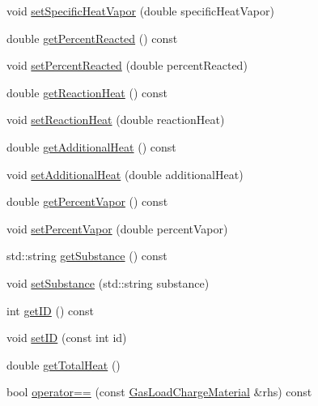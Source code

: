 \begin{DoxyCompactItemize}
\item 
void \hyperlink{class_gas_load_charge_material_a7498eba84bb8bdfc5344f0e44418260b}{set\+Specific\+Heat\+Vapor} (double specific\+Heat\+Vapor)
\item 
double \hyperlink{class_gas_load_charge_material_af47b4c6c3e547325cadd81cbb09937ee}{get\+Percent\+Reacted} () const
\item 
void \hyperlink{class_gas_load_charge_material_a7142cb6bbfba53d640dd6f1590fe32f6}{set\+Percent\+Reacted} (double percent\+Reacted)
\item 
double \hyperlink{class_gas_load_charge_material_a605eaf21d1f25f27b53627aeb903c93d}{get\+Reaction\+Heat} () const
\item 
void \hyperlink{class_gas_load_charge_material_a721f02cbd0bfbb6ebe67c0da09f0b0f2}{set\+Reaction\+Heat} (double reaction\+Heat)
\item 
double \hyperlink{class_gas_load_charge_material_a5c01f171b61c01c93db6453cb122e1ba}{get\+Additional\+Heat} () const
\item 
void \hyperlink{class_gas_load_charge_material_a08ef5196ea9919dfc71be6744c7da08e}{set\+Additional\+Heat} (double additional\+Heat)
\item 
double \hyperlink{class_gas_load_charge_material_a19b8ecfad235b5824b0a88903cff667a}{get\+Percent\+Vapor} () const
\item 
void \hyperlink{class_gas_load_charge_material_acace81e16ef531acb0a68462ab0ed25d}{set\+Percent\+Vapor} (double percent\+Vapor)
\item 
std\+::string \hyperlink{class_gas_load_charge_material_a5f967841f196f6b0b35f32f9610092e3}{get\+Substance} () const
\item 
void \hyperlink{class_gas_load_charge_material_a20cc3df601d8daae9b8f8e7b0c53c2e3}{set\+Substance} (std\+::string substance)
\item 
int \hyperlink{class_gas_load_charge_material_ab3e425ad095a593b7e9e365606759d9d}{get\+ID} () const
\item 
void \hyperlink{class_gas_load_charge_material_a12d67d6f764318ab09ca340884e717f9}{set\+ID} (const int id)
\item 
double \hyperlink{class_gas_load_charge_material_a4f831537652ca09c4539982c626cc164}{get\+Total\+Heat} ()
\item 
\mbox{\label{class_gas_load_charge_material_ac1d95bdf7d61d8ed98629aa17bf2c4b1}} 
bool \hyperlink{class_gas_load_charge_material_ac1d95bdf7d61d8ed98629aa17bf2c4b1}{operator==} (const \hyperlink{class_gas_load_charge_material}{Gas\+Load\+Charge\+Material} \&rhs) const

\end{DoxyCompactItemize}

